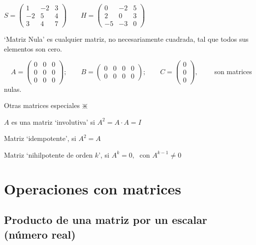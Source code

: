 \begin{ejem}
$S=\left( \begin{matrix} 1&-2&3 \\-2&5&4 \\ 3&4&7  \end{matrix}\right)	\qquad H=\left( \begin{matrix} 0&-2&5 \\2 &0& 3 \\ -5&-3&0 \end{matrix}\right)$
\end{ejem}
\begin{defi}
`Matriz Nula' es cualquier matriz, no necesariamente cuadrada, tal que todos sus elementos son cero.

$\quad A=\left( \begin{matrix} 0&0&0\\0&0&0\\0&0&0   \end{matrix}\right); \qquad B=\left( \begin{matrix} 0&0&0&0 	\\ 0&0&0&0  \end{matrix}\right); \qquad C=\left( \begin{matrix} 0\\0\\0  \end{matrix}\right), \qquad $ son matrices nulas.	
\end{defi}

\begin{defi}

\textcolor{gris}{Otras matrices especiales $\divideontimes$}

\textcolor{gris}{$A$ es una matriz `involutiva' si $A^2=A\cdot A=I$}

\textcolor{gris}{Matriz `idempotente', si $A^2=A$}

\textcolor{gris}{Matriz `nihilpotente de orden $k$', si $A^k=0,\;$ con $A^{k-1}\neq 0$}
	
\end{defi}



\section{Operaciones con matrices}

\subsection{Producto de una matriz por un escalar (número real)}

